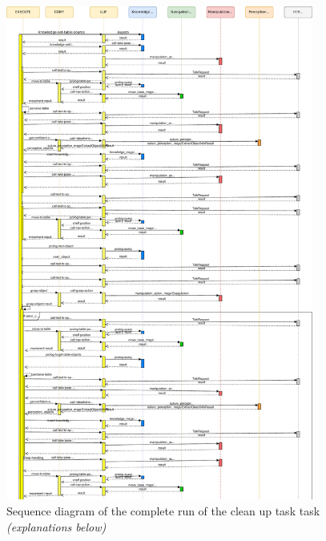 \documentclass[main.tex]{subfiles}
\begin{document}
	  	\begin{figure}[H]
	  		\centering
	  		\includegraphics[width=0.9\textwidth]{pictures/diagramms/grocery_01_seq}
	  		\caption{Sequence diagram of the complete run of the clean up task task \textit{(explanations below)}}
	  		\label{clean_up_seq_01}
	  	\end{figure}
\end{document}
